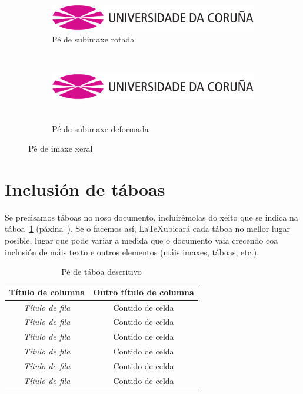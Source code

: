 \begin{figure}[hp!]
  \centering
  \begin{subfigure}[c]{0.3\textwidth}
    \includegraphics[angle=45,width=\textwidth]{imaxes/udc.png}
    \caption{Pé de subimaxe rotada}
    \label{fig:subfigura-rotada}
  \end{subfigure}
  \hspace{0.1\textwidth}
  \begin{subfigure}[c]{0.3\textwidth}
    \includegraphics[width=\textwidth,height=3cm]{imaxes/udc.png}
    \caption{Pé de subimaxe deformada}
    \label{fig:subfigura-deformada}
  \end{subfigure}
  \caption{Pé de imaxe xeral}
  \label{fig:exemplo-subfiguras}
\end{figure}

\section{Inclusión de táboas}

Se precisamos táboas no noso documento, incluirémolas do xeito que se
indica na táboa~\ref{tab:exemplo} (páxina~\pageref{tab:exemplo}). Se
o facemos así, \LaTeX ubicará cada táboa no mellor lugar posible,
lugar que pode variar a medida que o documento vaia crecendo coa
inclusión de máis texto e outros elementos (máis imaxes, táboas,
etc.).

\begin{table}[hp!]
  \centering
  \begin{tabular}{c|c}
  \rowcolor{udcpink!25}
  \textbf{Título de columna} & \textbf{Outro título de columna} \\\hline
  \textit{Título de fila} & Contido de celda \\
  \textit{Título de fila} & Contido de celda \\
  \textit{Título de fila} & Contido de celda \\
  \textit{Título de fila} & Contido de celda \\
  \textit{Título de fila} & Contido de celda \\
  \textit{Título de fila} & Contido de celda \\
  \end{tabular}
  \caption{Pé de táboa descritivo}
  \label{tab:exemplo}
\end{table}

